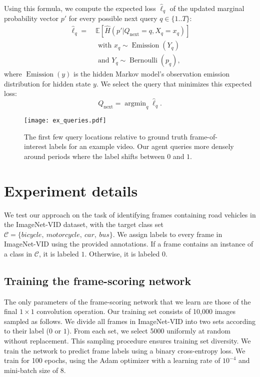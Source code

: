 \documentclass[10pt,twocolumn,letterpaper]{article}
\begin{document}
Using this formula, we compute the expected loss $\hat\ell_q$ of the updated marginal probability vector $p'$ for every possible next query $q \in \{1..T\}$:
\begin{align*}
    \hat\ell_q =\ &\mathbb{E}[\hat{H}(p'|Q_\text{next}=q,X_q=x_q)] \\
           &\text{ with } x_q \sim \operatorname{Emission}(Y_q) \\
           &\text{ and } Y_q \sim \operatorname{Bernoulli}(p_q),
\end{align*}
where $\operatorname{Emission}(y)$ is the hidden Markov model's observation emission distribution for hidden state $y$. We select the query that minimizes this expected loss:
$$
    Q_\text{next} = \operatorname{argmin}_q \hat\ell_q.
$$

\begin{figure*}
\begin{center}
    \vspace{0.5cm}
    \texttt{[image: ex\_queries.pdf]}
\end{center}
    \caption{The first few query locations relative to ground truth frame-of-interest labels for an example video. Our agent queries more densely around periods where the label shifts between $0$ and $1$.}
\label{ex_queries}
\end{figure*}

\section{Experiment details}

We test our approach on the task of identifying frames containing road vehicles in the ImageNet-VID dataset, with the target class set $\mathcal{C} = \lbrace bicycle,\ motorcycle,\ car,\ bus \rbrace$. We assign labels to every frame in ImageNet-VID using the provided annotations. If a frame contains an instance of a class in $\mathcal{C}$, it is labeled $1$. Otherwise, it is labeled $0$.

\subsection{Training the frame-scoring network}

The only parameters of the frame-scoring network that we learn are those of the final $1\times 1$ convolution operation. Our training set consists of 10,000 images sampled as follows. We divide all frames in ImageNet-VID into two sets according to their label ($0$ or $1$). From each set, we select 5000 uniformly at random without replacement. This sampling procedure ensures training set diversity. We train the network to predict frame labels using a binary cross-entropy loss. We train for 100 epochs, using the Adam optimizer \cite{kingma2014adam} with a learning rate of $10^{-4}$ and mini-batch size of 8.
\end{document}
